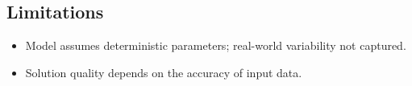\documentclass[11pt, a4paper]{article}
\begin{document}
\subsection{Limitations}

\begin{polyawarnbox}
\begin{itemize}
  \item Model assumes deterministic parameters; real-world variability not captured.
  \item Solution quality depends on the accuracy of input data.
\end{itemize}
\end{polyawarnbox}

\end{document}
